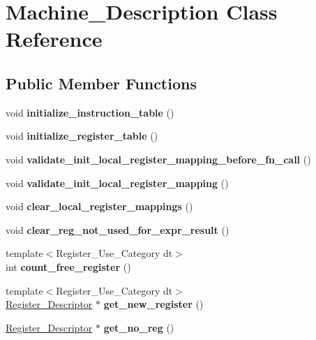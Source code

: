 \hypertarget{classMachine__Description}{}\section{Machine\+\_\+\+Description Class Reference}
\label{classMachine__Description}
\subsection*{Public Member Functions}
\begin{DoxyCompactItemize}
\item 
\mbox{\label{classMachine__Description_ae41b3d24e739b0f72e2a368e4554d59a}} 
void {\bfseries initialize\+\_\+instruction\+\_\+table} ()
\item 
\mbox{\label{classMachine__Description_aea2c191e8c23720a89c4c7e1d706fccc}} 
void {\bfseries initialize\+\_\+register\+\_\+table} ()
\item 
\mbox{\label{classMachine__Description_ac174c5197e269140a1df808528bed17e}} 
void {\bfseries validate\+\_\+init\+\_\+local\+\_\+register\+\_\+mapping\+\_\+before\+\_\+fn\+\_\+call} ()
\item 
\mbox{\label{classMachine__Description_a37a985c2f6c5cab5643198fbcfcd612f}} 
void {\bfseries validate\+\_\+init\+\_\+local\+\_\+register\+\_\+mapping} ()
\item 
\mbox{\label{classMachine__Description_a25249f9cf13799a68d7cb61b4f9f441e}} 
void {\bfseries clear\+\_\+local\+\_\+register\+\_\+mappings} ()
\item 
\mbox{\label{classMachine__Description_a7e4f6cb207f09ea0af63bbd6d6b4ed0f}} 
void {\bfseries clear\+\_\+reg\+\_\+not\+\_\+used\+\_\+for\+\_\+expr\+\_\+result} ()
\item 
\mbox{\label{classMachine__Description_a48ec0a979193c96cc2358a1734d2a3d2}} 
{\footnotesize template$<$Register\+\_\+\+Use\+\_\+\+Category dt$>$ }\\int {\bfseries count\+\_\+free\+\_\+register} ()
\item 
\mbox{\label{classMachine__Description_ad87702471660a53e20aecbccc720ee05}} 
{\footnotesize template$<$Register\+\_\+\+Use\+\_\+\+Category dt$>$ }\\\hyperlink{classRegister__Descriptor}{Register\+\_\+\+Descriptor} $\ast$ {\bfseries get\+\_\+new\+\_\+register} ()
\item 
\mbox{\label{classMachine__Description_a2c7d822e878f24f24c81b9797358b4fb}} 
\hyperlink{classRegister__Descriptor}{Register\+\_\+\+Descriptor} $\ast$ {\bfseries get\+\_\+no\+\_\+reg} ()
\end{DoxyCompactItemize}
